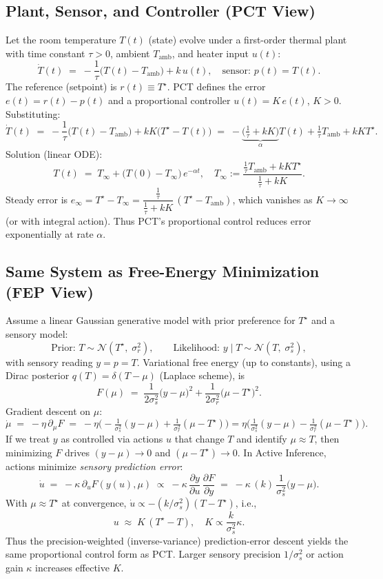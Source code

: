 \documentclass[a4paper,11pt,openany]{book}
\begin{document}
\subsection{Plant, Sensor, and Controller (PCT View)}

Let the room temperature $T(t)$ (state) evolve under a first-order thermal plant with time constant $\tau>0$, ambient $T_{\mathrm{amb}}$, and heater input $u(t)$:
\[
\dot T(t) \;=\; -\frac{1}{\tau}\big(T(t)-T_{\mathrm{amb}}\big) + k\,u(t),
\quad \text{sensor: } p(t)=T(t).
\]
The reference (setpoint) is $r(t)\equiv T^\star$. PCT defines the error $e(t)=r(t)-p(t)$ and a proportional controller $u(t)=K\,e(t)$, $K>0$. Substituting:
\[
\dot T(t) \;=\; -\frac{1}{\tau}\big(T(t)-T_{\mathrm{amb}}\big) + kK\big(T^\star - T(t)\big)
\;=\; -\underbrace{\Big(\tfrac{1}{\tau}+kK\Big)}_{\alpha} T(t) + \tfrac{1}{\tau}T_{\mathrm{amb}} + kK T^\star.
\]
Solution (linear ODE):
\[
T(t) \;=\; T_\infty + \big(T(0)-T_\infty\big)\,e^{-\alpha t},
\quad 
T_\infty := \frac{\tfrac{1}{\tau}T_{\mathrm{amb}} + kK T^\star}{\tfrac{1}{\tau}+kK}.
\]
Steady error is $e_\infty = T^\star - T_\infty = \dfrac{\tfrac{1}{\tau}}{\tfrac{1}{\tau}+kK}\,(T^\star - T_{\mathrm{amb}})$, which vanishes as $K\to\infty$ (or with integral action). Thus PCT’s proportional control reduces error exponentially at rate $\alpha$.

\subsection{Same System as Free-Energy Minimization (FEP View)}

Assume a linear Gaussian generative model with prior preference for $T^\star$ and a sensory model:
\[
\text{Prior: } T \sim \mathcal{N}(T^\star,\;\sigma_r^2), 
\qquad
\text{Likelihood: } y \mid T \sim \mathcal{N}(T,\;\sigma_s^2),
\]
with sensory reading $y=p=T$. Variational free energy (up to constants), using a Dirac posterior $q(T)=\delta(T-\mu)$ (Laplace scheme), is
\[
F(\mu) \;=\; \frac{1}{2\sigma_s^2}\big(y-\mu\big)^2 + \frac{1}{2\sigma_r^2}\big(\mu - T^\star\big)^2.
\]
Gradient descent on $\mu$:
\[
\dot\mu \;=\; -\eta\,\partial_\mu F \;=\; -\eta\Big(\! -\tfrac{1}{\sigma_s^2}(y-\mu) + \tfrac{1}{\sigma_r^2}(\mu - T^\star)\!\Big)
= \eta\Big(\tfrac{1}{\sigma_s^2}(y-\mu) - \tfrac{1}{\sigma_r^2}(\mu - T^\star)\Big).
\]
If we treat $y$ as controlled via actions $u$ that change $T$ and identify $\mu\approx T$, then minimizing $F$ drives $(y-\mu)\to 0$ and $(\mu-T^\star)\to 0$. In Active Inference, actions minimize \emph{sensory prediction error}:
\[
\dot u \;=\; -\kappa\,\partial_u F(y(u),\mu) 
\;\propto\; -\kappa\,\frac{\partial y}{\partial u}\,\frac{\partial F}{\partial y}
\;=\; -\kappa\,(k)\,\frac{1}{\sigma_s^2}\big(y-\mu\big).
\]
With $\mu\approx T^\star$ at convergence, $\dot u \propto - (k/\sigma_s^2) (T - T^\star)$, i.e.,
\[
u \;\approx\; K\,(T^\star - T), \quad K \propto \frac{k}{\sigma_s^2}\kappa.
\]
Thus the precision-weighted (inverse-variance) prediction-error descent yields the same proportional control form as PCT. Larger sensory precision $1/\sigma_s^2$ or action gain $\kappa$ increases effective $K$.
\end{document}
